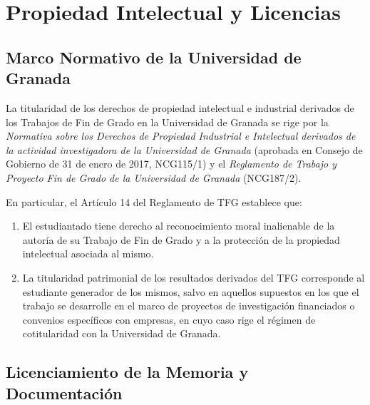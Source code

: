 
\chapter{Propiedad Intelectual y Licencias}
\label{ap:licencias}

\section{Marco Normativo de la Universidad de Granada}
\label{sec:ap_normativa_ugr}

La titularidad de los derechos de propiedad intelectual e industrial derivados de los Trabajos de Fin de Grado en la Universidad de Granada se rige por la \textit{Normativa sobre los Derechos de Propiedad Industrial e Intelectual derivados de la actividad investigadora de la Universidad de Granada} (aprobada en Consejo de Gobierno de 31 de enero de 2017, NCG115/1) y el \textit{Reglamento de Trabajo y Proyecto Fin de Grado de la Universidad de Granada} (NCG187/2).

En particular, el Artículo 14 del Reglamento de TFG establece que:
\begin{enumerate}
    \item El estudiantado tiene derecho al reconocimiento moral inalienable de la autoría de su Trabajo de Fin de Grado y a la protección de la propiedad intelectual asociada al mismo.
    \item La titularidad patrimonial de los resultados derivados del TFG corresponde al estudiante generador de los mismos, salvo en aquellos supuestos en los que el trabajo se desarrolle en el marco de proyectos de investigación financiados o convenios específicos con empresas, en cuyo caso rige el régimen de cotitularidad con la Universidad de Granada.
\end{enumerate}

\section{Licenciamiento de la Memoria y Documentación}
\label{sec:ap_licencia_memoria}


